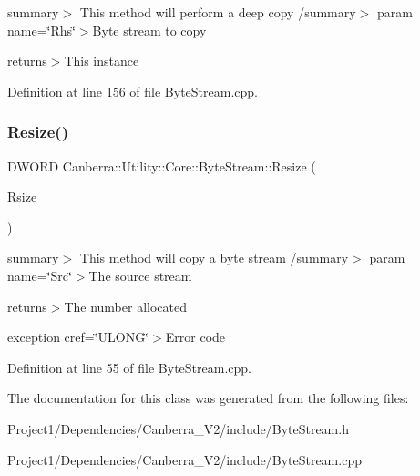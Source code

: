 summary$>$ This method will perform a deep copy /summary$>$ param name=\char`\"{}\+Rhs\char`\"{}$>$Byte stream to copy

returns$>$This instance

Definition at line 156 of file Byte\+Stream.\+cpp.

\mbox{\label{class_canberra_1_1_utility_1_1_core_1_1_byte_stream_afbcb6de31f0f9b09ee532550c2be8bb7_afbcb6de31f0f9b09ee532550c2be8bb7}} 
\subsubsection{\texorpdfstring{Resize()}{Resize()}}
{\footnotesize\ttfamily D\+W\+O\+RD Canberra\+::\+Utility\+::\+Core\+::\+Byte\+Stream\+::\+Resize (\begin{DoxyParamCaption}\item[{D\+W\+O\+RD}]{Rsize }\end{DoxyParamCaption})}

summary$>$ This method will copy a byte stream /summary$>$ param name=\char`\"{}\+Src\char`\"{}$>$The source stream

returns$>$The number allocated

exception cref=\char`\"{}\+U\+L\+O\+N\+G\char`\"{}$>$Error code

Definition at line 55 of file Byte\+Stream.\+cpp.



The documentation for this class was generated from the following files\+:\begin{DoxyCompactItemize}
\item 
Project1/\+Dependencies/\+Canberra\+\_\+\+V2/include/Byte\+Stream.\+h\item 
Project1/\+Dependencies/\+Canberra\+\_\+\+V2/include/Byte\+Stream.\+cpp\end{DoxyCompactItemize}
